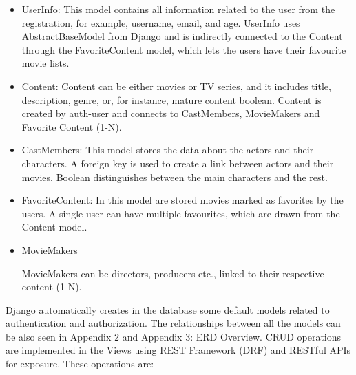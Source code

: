 \documentclass[letterpaper,twocolumn]{article}
\begin{document}
\begin{itemize}
    \item UserInfo: This model contains all information related to the user from the registration, for example, username, email, and age. UserInfo uses AbstractBaseModel from Django and is indirectly connected to the Content through the FavoriteContent model, which lets the users have their favourite movie lists. 

    \item Content: Content can be either movies or TV series, and it includes title, description, genre, or, for instance, mature content boolean. Content is created by auth-user and connects to CastMembers, MovieMakers and Favorite Content (1-N).

    \item CastMembers: This model stores the data about the actors and their characters. A foreign key is used to create a link between actors and their movies. Boolean distinguishes between the main characters and the rest. 

    \item FavoriteContent: In this model are stored movies marked as favorites by the users. A single user can have multiple favourites, which are drawn from the Content model. 

    \item MovieMakers

MovieMakers can be directors, producers etc., linked to their respective content (1-N).
    
\end{itemize}

Django automatically creates in the database some default models related to authentication and authorization. The relationships between all the models can be also seen in Appendix 2 and Appendix 3: ERD Overview. CRUD operations are implemented in the Views using REST Framework (DRF) and RESTful APIs for exposure. These operations are: 
\end{document}

